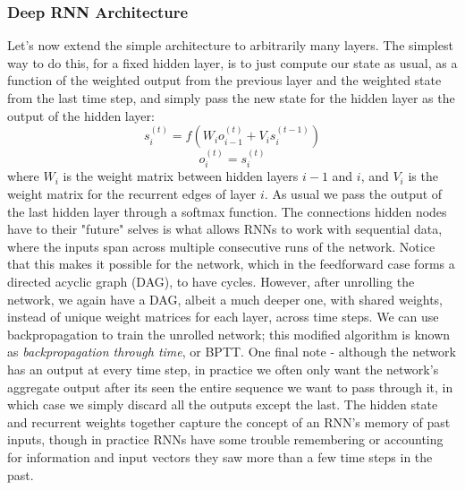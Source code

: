 \documentclass{article}
\begin{document}
\subsubsection{Deep RNN Architecture}
Let's now extend the simple architecture to arbitrarily many layers. The simplest way to do this, for a fixed hidden layer, is to just compute our state as usual, as a function of the weighted output from the previous layer and the weighted state from the last time step, and simply pass the new state for the hidden layer as the output of the hidden layer:
$$ s_i^{(t)} = f(W_i o_{i - 1}^{(t)} + V_i s_i^{(t - 1)}) $$
$$ o_i^{(t)} = s_i^{(t)} $$
where $ W_i $ is the weight matrix between hidden layers $ i - 1 $ and $ i $, and $ V_i $ is the weight matrix for the recurrent edges of layer $ i $. As usual we pass the output of the last hidden layer through a softmax function.
\newline \newline
The connections hidden nodes have to their "future" selves is what allows RNNs to work with sequential data, where the inputs span across multiple consecutive runs of the network. Notice that this makes it possible for the network, which in the feedforward case forms a directed acyclic graph (DAG), to have cycles. However, after unrolling the network, we again have a DAG, albeit a much deeper one, with shared weights, instead of unique weight matrices for each layer, across time steps. We can use backpropagation to train the unrolled network; this modified algorithm is known as \textit{backpropagation through time}, or BPTT. One final note - although the network has an output at every time step, in practice we often only want the network's aggregate output after its seen the entire sequence we want to pass through it, in which case we simply discard all the outputs except the last. The hidden state and recurrent weights together capture the concept of an RNN's memory of past inputs, though in practice RNNs have some trouble remembering or accounting for information and input vectors they saw more than a few time steps in the past.
\end{document}
